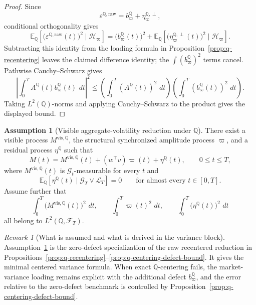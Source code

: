 \documentclass[11pt,a4paper]{amsart}
\theoremstyle{plain}
\theoremstyle{definition}
\newtheorem{assumption}[theorem]{Assumption}
\theoremstyle{remark}
\newtheorem{remark}[theorem]{Remark}
\newcommand{\QQ}{\mathbb{Q}}
\newcommand{\EE}{\mathbb{E}}
\newcommand{\cF}{\mathcal{F}}
\newcommand{\cG}{\mathcal{G}}
\newcommand{\cH}{\mathcal{H}}
\newcommand{\cL}{\mathcal{L}}
\newcommand{\dd}{\,d}
\begin{document}
\begin{proof}
Since
\[
        \varepsilon^{\QQ,\mathrm{raw}}
        =
        b_\varpi^\QQ+\eta_\varpi^{\QQ,\perp},
\]
conditional orthogonality gives
\[
        \EE_\QQ\!\left[
                \bigl(\varepsilon^{\QQ,\mathrm{raw}}(t)\bigr)^2
                \mid\cH_\varpi
        \right]
        =
        \bigl(b_\varpi^\QQ(t)\bigr)^2
        +
        \EE_\QQ\!\left[
                \bigl(\eta_\varpi^{\QQ,\perp}(t)\bigr)^2
                \mid\cH_\varpi
        \right].
\]
Subtracting this identity from the loading formula in Proposition~\ref{prop:q-recentering}
leaves the claimed difference identity; the \(\int (b_\varpi^\QQ)^2\) terms cancel.  Pathwise
Cauchy--Schwarz gives
\[
        \left|\int_0^T A^\QQ(t)b_\varpi^\QQ(t)\,\dd t\right|^2
        \le
        \left(\int_0^T (A^\QQ(t))^2\,\dd t\right)
        \left(\int_0^T (b_\varpi^\QQ(t))^2\,\dd t\right).
\]
Taking \(L^2(\QQ)\)-norms and applying Cauchy--Schwarz to the product gives the displayed bound.
\end{proof}

\begin{assumption}[Visible aggregate-volatility reduction under \(\QQ\)]\label{ass:q-visible-aggregate}
There exist a visible process \(M^{\mathrm{vis},\QQ}\), the structural synchronized amplitude
process \(\varpi\), and a residual process \(\eta^\QQ\) such that
\[
        M(t)=M^{\mathrm{vis},\QQ}(t)+(w^\top v)\varpi(t)+\eta^\QQ(t),
        \qquad
        0\le t\le T,
\]
where \(M^{\mathrm{vis},\QQ}(t)\) is \(\cG_t\)-measurable for every \(t\) and
\[
        \EE_\QQ[\eta^\QQ(t)\mid \cG_T\vee\cL_T]=0
        \qquad
        \text{for almost every } t\in[0,T].
\]
Assume further that
\[
        \int_0^T \bigl(M^{\mathrm{vis},\QQ}(t)\bigr)^2\,\dd t,
        \qquad
        \int_0^T \varpi(t)^2\,\dd t,
        \qquad
        \int_0^T \bigl(\eta^\QQ(t)\bigr)^2\,\dd t
\]
all belong to \(L^2(\QQ,\cF_T)\).
\end{assumption}

\begin{remark}[What is assumed and what is derived in the variance block]
Assumption~\ref{ass:q-visible-aggregate} is the zero-defect specialization of the raw recentered
reduction in Propositions~\ref{prop:q-recentering}--\ref{prop:q-centering-defect-bound}.  It gives
the minimal centered variance formula.  When exact \(\QQ\)-centering fails, the market-variance
loading remains explicit with the additional defect \(b_\varpi^\QQ\), and the error relative to the
zero-defect benchmark is controlled by Proposition~\ref{prop:q-centering-defect-bound}.
\end{remark}
\end{document}
